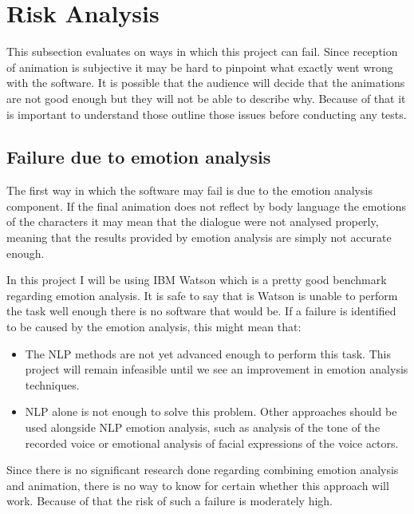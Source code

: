 \section{Risk Analysis}
\label{sec:riskanal}

This subsection evaluates on ways in which this project can fail. Since reception of animation is subjective it may be hard to pinpoint what exactly went wrong with the software. It is possible that the audience will decide that the animations are not good enough but they will not be able to describe why. Because of that it is important to understand those outline those issues before conducting any tests.

\bigskip
\subsection{Failure due to emotion analysis}
The first way in which the software may fail is due to the emotion analysis component. If the final animation does not reflect by body language the emotions of the characters it may mean that the dialogue were not analysed properly, meaning that the results provided by emotion analysis are simply not accurate enough.

In this project I will be using IBM Watson which is a pretty good benchmark regarding emotion analysis. It is safe to say that is Watson is unable to perform the task well enough there is no software that would be. If a failure is identified to be caused by the emotion analysis, this might mean that:
\begin{itemize}
\item The NLP methods are not yet advanced enough to perform this task. This project will remain infeasible until we see an improvement in emotion analysis techniques.
\item NLP alone is not enough to solve this problem. Other approaches should be used alongside NLP emotion analysis, such as analysis of the tone of the recorded voice or emotional analysis of facial expressions of the voice actors.
\end{itemize}

Since there is no significant research done regarding combining emotion analysis and animation, there is no way to know for certain whether this approach will work. Because of that the risk of such a failure is moderately high.


\bigskip
